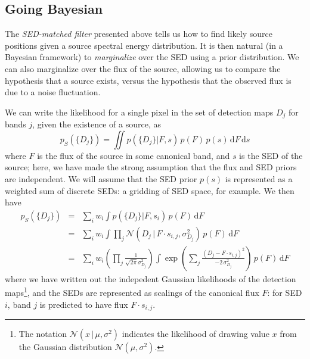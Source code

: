 \documentclass[11pt,letterpaper,linenumbers]{aastex63}
\newcommand{\gaussianN}{\mathcal{N}}
\newcommand{\gaussian}[1]{\gaussianN\!\left(#1\right)}
\newcommand{\dd}{\mathrm{d}}
\begin{document}
\subsection{Going Bayesian}

The \emph{SED-matched filter} presented above tells us how to find
likely source positions given a source spectral energy distribution.
It is then natural (in a Bayesian framework) to \emph{marginalize}
over the SED using a prior distribution.  We can also marginalize over
the flux of the source, allowing us to compare the hypothesis that a
source exists, versus the hypothesis that the observed flux is due to
a noise fluctuation.

We can write the likelihood for a single pixel in the set of detection
maps $D_j$ for bands $j$, given the existence of a source, as
\begin{equation}
  p_S(\{ D_j \}) = \iint p(\{ D_j \} | F, s) \, p(F) \, p(s) \, \dd F \, \dd s
\end{equation}
where $F$ is the flux of the source in some canonical band, and $s$ is
the SED of the source; here, we have made the strong assumption that the
flux and SED priors are independent.  We will assume that the SED prior $p(s)$ is
represented as a weighted sum of discrete SEDs: a gridding of SED
space, for example.  We then have
\begin{eqnarray}
  p_S(\{ D_j \})
  &=&
  \sum_{i} w_i \int p(\{ D_j \} | F, s_i) \, p(F) \, \dd F
  \\
  &=&
  \sum_i w_i \int \prod_j \gaussian{D_j \,|\, F \cdot s_{i,j}, \sigma_{D_j}^2} \, p(F) \, \dd F
  \\
  &=&
  \sum_i w_i 
  \left( \prod_j \frac{1}{\sqrt{2 \pi} \sigma_{D_j}^2} \right)
  \int 
    \exp{ \left( \sum_j \frac{(D_j - F \cdot s_{i,j})^2}{-2 \, \sigma_{D_j}^2} \right) }
    \, p(F) \, \dd F
\end{eqnarray}
%
where we have written out the indepedent Gaussian likelihoods of the
detection maps\footnote{The notation $\gaussian{x \,|\, \mu, \sigma^2}$ indicates the likelihood
  of drawing value $x$ from the Gaussian distribution $\gaussian{\mu, \sigma^2}$.},
and the SEDs are represented as scalings of the
canonical flux $F$: for SED $i$, band $j$ is predicted to have flux $F
\cdot s_{i,j}$.
\end{document}
